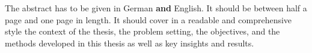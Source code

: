 \documentclass[
     12pt,         %
     a4paper,      %
     BCOR10mm,     %
     DIV14,        %
     ]{scrreprt}
\begin{document}

The abstract has to be given in German \textbf{and} English. It should
be between half a page and one page in length. It should cover in a
readable and comprehensive style the context of the thesis, the
problem setting, the objectives, and the methods developed in this
thesis as well as key insights and results.
\end{document}
